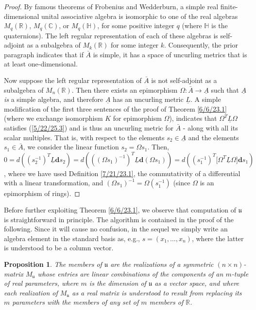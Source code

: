 \documentclass{amsart}
\newtheorem{proposition}[theorem]{Proposition}
\theoremstyle{definition}
\numberwithin{theorem}{section}
\numberwithin{equation}{section}
\begin{document}
\begin{proof}
 By famous theorems of Frobenius and Wedderburn, a simple real finite-dimensional unital associative algebra is isomorphic to one of the real algebras $M_q(\mathbb{R})$, $M_q(\mathbb{C})$, or $M_q(\mathbb{H})$, for some positive integer $q$ (where $\mathbb{H}$ is the quaternions).  The left regular representation of each of these algebras is self-adjoint as a subalgebra of $M_k(\mathbb{R})$ for some integer $k$.  Consequently, the prior paragraph indicates that if $\bar{A}$ is simple, it has a space of uncurling metrics that is at least one-dimensional.  
 
 Now suppose the left regular representation of $\bar{A}$ is not self-adjoint as a subalgebra of $M_n(\mathbb{R})$. Then there exists an epimorphism $\Omega:\bar{A}\rightarrow \underline{A}$ such that $ \underline{A}$ {\it is} a simple algebra, and therefore $\underline{A}$ has an uncurling metric $\underline{L}$.  A simple modification of the first three sentences of the proof of Theorem \ref{6/6/23.1} (where we exchange isomorphism $K$ for epimorphism $\Omega$), indicates that $\Omega^T \underline{L}\Omega$ satisfies (\ref{5/22/25.3}) and is thus an uncurling metric for $\bar{A}$ - along with all its scalar multiples.   That is, with respect to the elements $s_2\in \underline{A}$ and the elements $s_1\in\bar{A}$, we consider the linear function $s_2= \Omega s_1$.  Then, $0 = d\left((s_2^{-1})^T \underline{L} \mathbf{d}s_2\right) =  d\left(((\Omega s_1)^{-1})^T \underline{L} \mathbf{d}(\Omega s_1)\right) = d\left((s_1^{-1})^T \big[\Omega^T \underline{L} \Omega \big]\mathbf{d}s_1\right)$, where we have used Definition \ref{7/21/23.1}, the commutativity of a differential with a linear transformation, and $(\Omega s_1)^{-1} = \Omega (s_1^{-1})$ (since $\Omega$ is an epimorphism of rings).   
  \end{proof}
 
 
Before further exploiting Theorem \ref{6/6/23.1}, we  observe that computation of $\mathfrak{u}$ is straightforward in principle.  The algorithm is contained in the proof of the following.  Since it will cause no confusion, in the sequel we simply write an algebra element in the standard basis as, e.g., $s=(x_1,\dots,x_n)$, where the latter is understood to be a column vector.

\begin{proposition}\label{9/2/24.1} The members of $\mathfrak{u}$ are the realizations of a symmetric $(n\times n)$-matrix $M_{\mathfrak{u}}$ whose entries are linear combinations of the components of an $m$-tuple of real parameters, where $m$ is the dimension of $\mathfrak{u}$ as a vector space, and where each realization of $M_{\mathfrak{u}}$ as a real matrix is understood to result from replacing its $m$ parameters with the members of any set of $m$ members of $\mathbb{R}$.   
\end{proposition}
\end{document}
